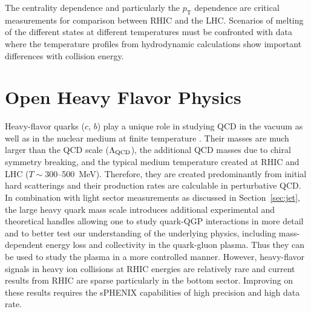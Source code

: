 The centrality dependence and particularly the $p_\mathrm{T}$ dependence are critical measurements for comparison between RHIC and the LHC.    Scenarios of melting of the different states at different temperatures must be confronted with data where the temperature profiles from hydrodynamic calculations show important differences with collision energy.

\section{Open Heavy Flavor Physics}
\label{sec:HF}

Heavy-flavor quarks ($c$, $b$) play a unique role in studying QCD in
the vacuum as well as in the nuclear medium at finite temperature . Their masses are much larger than the QCD scale
($\Lambda_{\rm QCD}$), the additional QCD masses due to chiral
symmetry breaking, and the typical medium temperature created at RHIC
and LHC ($T \sim 300$--500~MeV). Therefore, they are created
predominantly from initial hard scatterings and their production rates
are calculable in perturbative QCD. In combination with light sector
measurements as discussed in Section~\ref{sec:jet}, the large heavy
quark mass scale introduces additional experimental and theoretical
handles allowing one to study quark-QGP interactions in more detail
and to better test our understanding of the underlying physics,
including mass-dependent energy loss and collectivity in the quark-gluon plasma. Thus
they can be used to study the plasma in a more controlled manner.
However, heavy-flavor signals in heavy ion collisions at RHIC energies
are relatively rare and current results from RHIC are sparse particularly in the bottom sector.  Improving on these results requires
the sPHENIX capabilities of high precision and high data rate.


